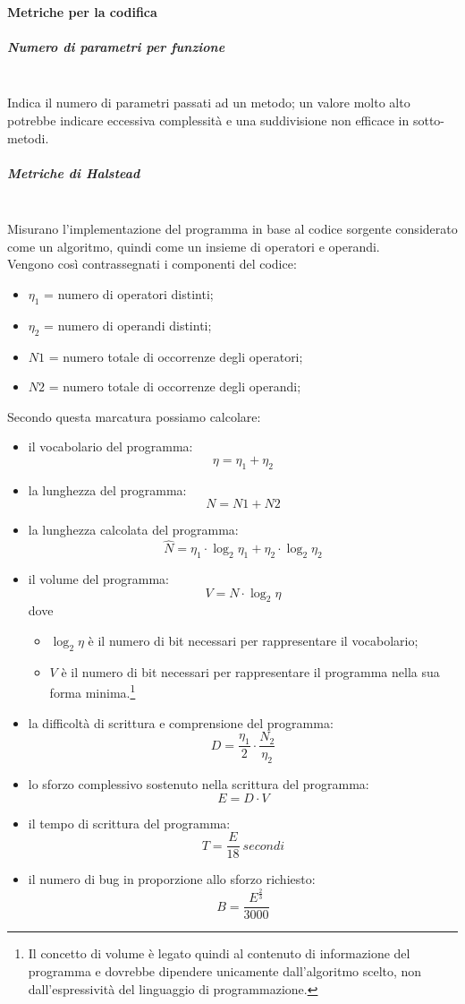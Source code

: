 \paragraph{Metriche per la codifica}\mbox{}
\subparagraph{Numero di parametri per funzione}\mbox{}\\
Indica il numero di parametri passati ad un metodo; un valore molto alto potrebbe indicare eccessiva complessità e una suddivisione non efficace in sotto-metodi.

\subparagraph{Metriche di Halstead}\mbox{}\\
Misurano l'implementazione del programma in base al codice sorgente considerato come un algoritmo, quindi come un insieme di operatori e operandi.\\
Vengono così contrassegnati i componenti del codice:
\begin{itemize}
	\item $\eta_{1}$ = numero di operatori distinti;
	\item $\eta_{2}$ = numero di operandi distinti;
	\item $N1$ = numero totale di occorrenze degli operatori; 
	\item $N2$ = numero totale di occorrenze degli operandi;
\end{itemize}
Secondo questa marcatura possiamo calcolare:
\begin{itemize}
	\item il vocabolario del programma:
	\[ \eta = \eta_{1} + \eta_{2} \]
	\item la lunghezza del programma:
	\[ N = N1 + N2 \]
	\item la lunghezza calcolata del programma: 
	\[ {\hat {N}}=\eta_{1} \cdot \log_{2}\eta_{1}+\eta_{2} \cdot \log_{2}\eta_{2} \]
	\item il volume del programma:
	\[ V = N \cdot \log_{2}\eta \] 
	dove
	\begin{itemize}
		\item $ \log_{2}\eta $ è il numero di bit necessari per rappresentare il vocabolario;
		\item $ V $ è il numero di bit necessari per rappresentare il programma nella sua forma minima.\footnote{Il concetto di volume è legato quindi al contenuto di informazione del programma e dovrebbe dipendere unicamente dall'algoritmo scelto, non dall'espressività del linguaggio di programmazione.}
	\end{itemize}
	\item la difficoltà di scrittura e comprensione del programma:
	\[ D = \frac{\eta_{1}}{2} \cdot \frac{N_{2}}{\eta_{2}} \]
	\item lo sforzo complessivo sostenuto nella scrittura del programma:
	\[ E = D \cdot V \]
	\item il tempo di scrittura del programma:
	\[ T=\frac{E}{18}\ secondi\]
	\item il numero di bug in proporzione allo sforzo richiesto:
	\[ B = \frac{E^{\frac{2}{3}}}{3000} \]	
\end{itemize}

